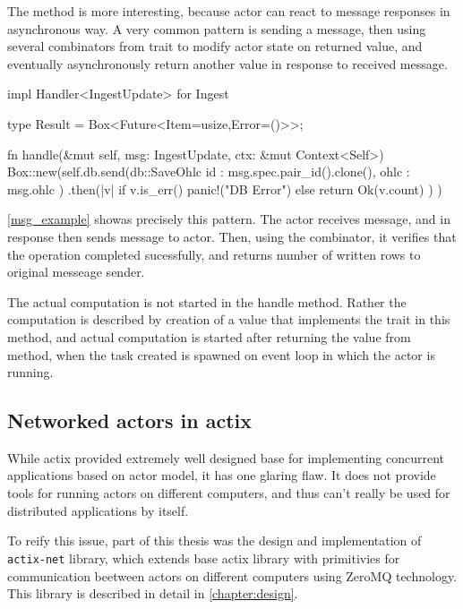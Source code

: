 The  method is more interesting, because actor can react to message responses in asynchronous way.
A very common pattern is sending a message, then using several combinators from  trait to modify actor
state on returned value, and eventually asynchronously return another value in response to received message.

\begin{code}[language=rust,label={msg_example},caption={Asynchronous message handling example}]
    impl Handler<IngestUpdate> for Ingest {
    type Result = Box<Future<Item=usize,Error=()>>;

    fn handle(&mut self, msg: IngestUpdate, ctx: &mut Context<Self>) {
    Box::new(self.db.send(db::SaveOhlc{
    id : msg.spec.pair_id().clone(),
    ohlc : msg.ohlc
    })
    .then(|v| if v.is_err() { panic!("DB Error")} else { return Ok(v.count) })
    )
    }
    }
\end{code}

\autoref{msg_example} showas precisely this pattern. The  actor receives  message,
and in response then sends  message to  actor. Then, using the  combinator, it
verifies that the operation completed sucessfully, and returns number of written rows to original messeage sender.

The actual computation is not started in the handle method. Rather the computation is described by creation
of a value that implements the  trait in this method, and actual computation is started after returning
the value from  method, when the task created is spawned on event loop in which the actor is running.

\subsection{Networked actors in actix}
While actix provided extremely well designed base for implementing concurrent applications based on actor model, it has
one glaring flaw. It does not provide tools for running actors on different computers, and thus can't really be used for
distributed applications by itself.

To reify this issue, part of this thesis was the design and implementation of \verb|actix-net| library, which extends
base actix library with primitivies for communication beetween actors on different computers using ZeroMQ technology.
This library is described in detail in \autoref{chapter:design}.

